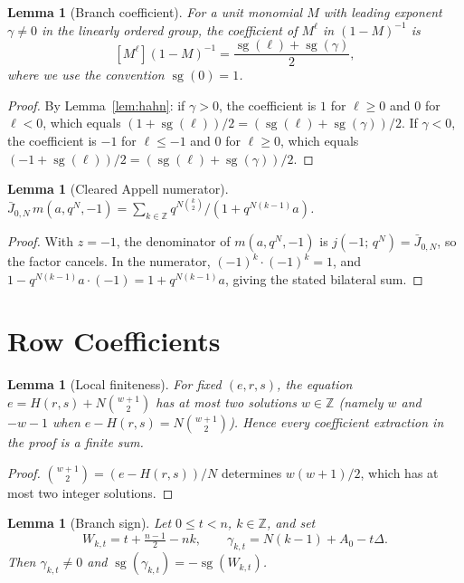 \documentclass[11pt]{article}
\newtheorem{lemma}[theorem]{Lemma}
\newcommand{\Z}{\mathbb{Z}}
\newcommand{\sg}{\operatorname{sg}}
\begin{document}
\begin{lemma}[Branch coefficient]\label{lem:branch}
For a unit monomial $M$ with leading exponent $\gamma\neq 0$ in the
linearly ordered group, the coefficient of $M^\ell$ in $(1-M)^{-1}$ is
\[
  [M^\ell](1-M)^{-1}=\frac{\sg(\ell)+\sg(\gamma)}{2},
\]
where we use the convention $\sg(0)=1$.
\end{lemma}

\begin{proof}
By Lemma~\ref{lem:hahn}: if $\gamma>0$, the coefficient is $1$ for
$\ell\ge 0$ and $0$ for $\ell<0$, which equals $(1+\sg(\ell))/2
=(\sg(\ell)+\sg(\gamma))/2$.  If $\gamma<0$, the coefficient is
$-1$ for $\ell\le -1$ and $0$ for $\ell\ge 0$, which equals
$(-1+\sg(\ell))/2=(\sg(\ell)+\sg(\gamma))/2$.
\end{proof}

\begin{lemma}[Cleared Appell numerator]\label{lem:cleared}
$\bar{J}_{0,N}\,m(a,q^N,-1)
=\sum_{k\in\Z} q^{N\binom{k}{2}}/(1+q^{N(k-1)}a)$.
\end{lemma}

\begin{proof}
With $z=-1$, the denominator of $m(a,q^N,-1)$ is
$j(-1;\,q^N)=\bar{J}_{0,N}$, so the factor cancels.  In the
numerator, $(-1)^k\cdot(-1)^k=1$, and $1-q^{N(k-1)}a\cdot(-1)
=1+q^{N(k-1)}a$, giving the stated bilateral sum.
\end{proof}

\section{Row Coefficients}\label{sec:rows}

\begin{lemma}[Local finiteness]\label{lem:finite}
For fixed $(e,r,s)$, the equation $e=H(r,s)+N\binom{w+1}{2}$ has
at most two solutions $w\in\Z$ (namely $w$ and $-w-1$ when
$e-H(r,s)=N\binom{w+1}{2}$).  Hence every coefficient extraction
in the proof is a finite sum.
\end{lemma}

\begin{proof}
$\binom{w+1}{2}=(e-H(r,s))/N$ determines $w(w+1)/2$, which has
at most two integer solutions.
\end{proof}

\begin{lemma}[Branch sign]\label{lem:branch-sign}
Let $0\le t<n$, $k\in\Z$, and set
\[
  W_{k,t}=t+\tfrac{n-1}{2}-nk,\qquad
  \gamma_{k,t}=N(k-1)+A_0-t\Delta.
\]
Then $\gamma_{k,t}\neq 0$ and $\sg(\gamma_{k,t})=-\sg(W_{k,t})$.
\end{lemma}
\end{document}
